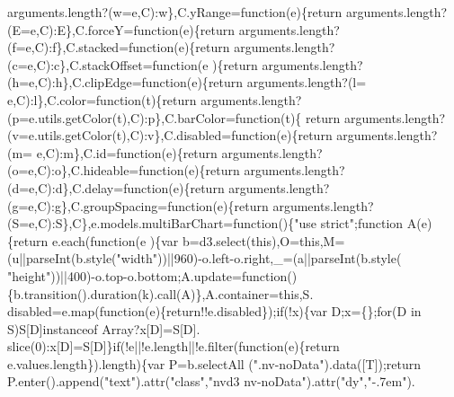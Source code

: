 \begin{DoxyCode}
{      arguments.length?(w=e,C):w\},C.yRange=\textcolor{keyword}{function}(e)\{\textcolor{keywordflow}{return} arguments.length?(E=e,C):E\},C.forceY=\textcolor{keyword}{function}(e)\{\textcolor{keywordflow}{return} 
      arguments.length?(f=e,C):f\},C.stacked=\textcolor{keyword}{function}(e)\{\textcolor{keywordflow}{return} arguments.length?(c=e,C):c\},C.stackOffset=\textcolor{keyword}{function}(e
      )\{\textcolor{keywordflow}{return} arguments.length?(h=e,C):h\},C.clipEdge=\textcolor{keyword}{function}(e)\{\textcolor{keywordflow}{return} arguments.length?(l=
      e,C):l\},C.color=\textcolor{keyword}{function}(t)\{\textcolor{keywordflow}{return} arguments.length?(p=e.utils.getColor(t),C):p\},C.barColor=\textcolor{keyword}{function}(t)\{\textcolor{keywordflow}{
      return} arguments.length?(v=e.utils.getColor(t),C):v\},C.disabled=\textcolor{keyword}{function}(e)\{\textcolor{keywordflow}{return} arguments.length?(m=
      e,C):m\},C.id=\textcolor{keyword}{function}(e)\{\textcolor{keywordflow}{return} arguments.length?(o=e,C):o\},C.hideable=\textcolor{keyword}{function}(e)\{\textcolor{keywordflow}{return} arguments.length?
      (d=e,C):d\},C.delay=\textcolor{keyword}{function}(e)\{\textcolor{keywordflow}{return} arguments.length?(g=e,C):g\},C.groupSpacing=\textcolor{keyword}{function}(e)\{\textcolor{keywordflow}{return} 
      arguments.length?(S=e,C):S\},C\},e.models.multiBarChart=\textcolor{keyword}{function}()\{\textcolor{stringliteral}{"use strict"};\textcolor{keyword}{function} A(e)\{\textcolor{keywordflow}{return} e.each(\textcolor{keyword}{function}(e
      )\{var b=d3.select(\textcolor{keyword}{this}),O=\textcolor{keyword}{this},M=(u||parseInt(b.style(\textcolor{stringliteral}{"width"}))||960)-o.left-o.right,\_=(a||parseInt(b.style(\textcolor{stringliteral}{
      "height"}))||400)-o.top-o.bottom;A.update=\textcolor{keyword}{function}()\{b.transition().duration(k).call(A)\},A.container=\textcolor{keyword}{this},S.
      disabled=e.map(\textcolor{keyword}{function}(e)\{\textcolor{keywordflow}{return}!!e.disabled\});\textcolor{keywordflow}{if}(!x)\{var D;x=\{\};\textcolor{keywordflow}{for}(D in S)S[D]instanceof Array?x[D]=S[D].
      slice(0):x[D]=S[D]\}\textcolor{keywordflow}{if}(!e||!e.length||!e.filter(\textcolor{keyword}{function}(e)\{return e.values.length\}).length)\{var P=b.selectAll
      (\textcolor{stringliteral}{".nv-noData"}).data([T]);\textcolor{keywordflow}{return} P.enter().append(\textcolor{stringliteral}{"text"}).attr(\textcolor{stringliteral}{"class"},\textcolor{stringliteral}{"nvd3 nv-noData"}).attr(\textcolor{stringliteral}{"dy"},\textcolor{stringliteral}{"-.7em"}).
}
\end{DoxyCode}
